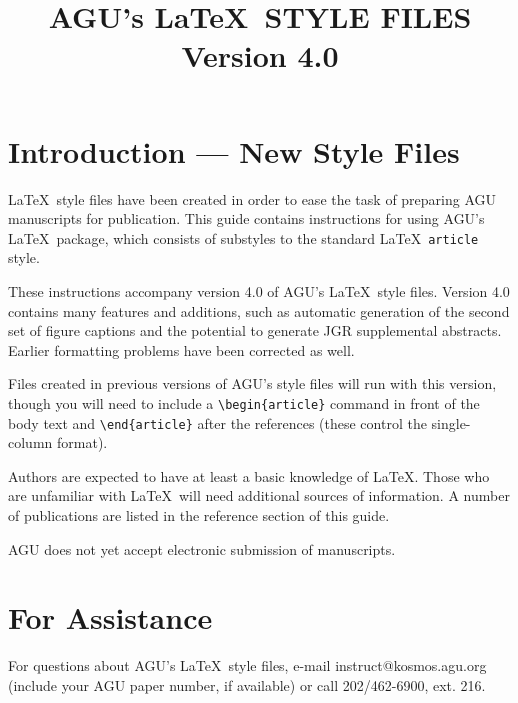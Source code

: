 
%
%

\setcounter{secnumdepth}{4}


\twocolumn

\title{\Large AGU's \LaTeX\ STYLE FILES Version 4.0}
\vspace{-2pc}

\begin{article}
\section{Introduction --- New Style Files}

\LaTeX\ style files have been created in order to 
ease the task of preparing AGU manuscripts for publication.
This guide contains instructions for using AGU's \LaTeX\ 
package, which consists of substyles to the standard \LaTeX\ 
{\tt article} style.

These instructions accompany version 4.0 of AGU's \LaTeX\ 
style files.  Version 4.0 contains many features and 
additions, such as automatic generation of the second 
set of figure captions and the potential to generate JGR 
supplemental abstracts.  Earlier formatting problems have 
been corrected as well.

Files created in previous versions of AGU's style files 
will run with this version, though you will need to include 
a \verb"\begin{article}" command in front of the body text 
and \verb"\end{article}" after the references (these 
control the single-column format).

Authors are expected to have at least a basic knowledge of 
\LaTeX.  Those who are unfamiliar with \LaTeX\ will need 
additional sources of information.  A number of publications 
are listed in the reference section of this guide.

AGU does not yet accept electronic submission of 
manuscripts.


\section{For Assistance}

For questions about AGU's \LaTeX\ style files, e-mail 
instruct@kosmos.agu.org (include your AGU paper number, 
if available) or call 202/462-6900, ext. 216.


\end{article}
